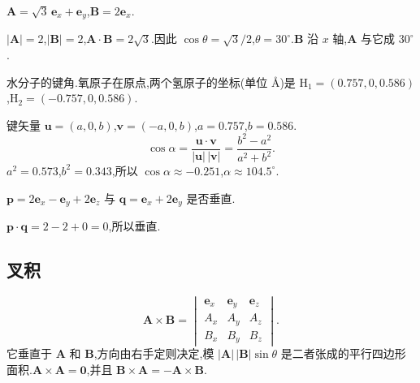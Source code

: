 \begin{example}
$\mathbf{A}=\sqrt{3}\,\mathbf{e}_x+\mathbf{e}_y$,$\mathbf{B}=2\mathbf{e}_x$.
\end{example}
\begin{solution}
$|\mathbf{A}|=2$,$|\mathbf{B}|=2$,$\mathbf{A}\cdot\mathbf{B}=2\sqrt{3}$.因此 $\cos\theta=\sqrt{3}/2$,$\theta=30^\circ$.$\mathbf{B}$ 沿 $x$ 轴,$\mathbf{A}$ 与它成 $30^\circ$.
\end{solution}

\begin{example}
水分子的键角.氧原子在原点,两个氢原子的坐标(单位 \AA)是 $\mathrm{H}_1=(0.757,0,0.586)$,$\mathrm{H}_2=(-0.757,0,0.586)$.
\end{example}
\begin{solution}
键矢量 $\mathbf{u}=(a,0,b)$,$\mathbf{v}=(-a,0,b)$,$a=0.757$,$b=0.586$.
\begin{equation}
  \cos\alpha=\frac{\mathbf{u}\cdot\mathbf{v}}{|\mathbf{u}|\,|\mathbf{v}|}
  =\frac{b^2-a^2}{a^2+b^2}.
\end{equation}
$a^2=0.573$,$b^2=0.343$,所以 $\cos\alpha\approx -0.251$,$\alpha\approx 104.5^\circ$.
\end{solution}

\begin{example}
$\mathbf{p}=2\mathbf{e}_x-\mathbf{e}_y+2\mathbf{e}_z$ 与 $\mathbf{q}=\mathbf{e}_x+2\mathbf{e}_y$ 是否垂直.
\end{example}
\begin{solution}
$\mathbf{p}\cdot\mathbf{q}=2-2+0=0$,所以垂直.
\end{solution}

\subsection{叉积}
\begin{equation}
  \mathbf{A}\times\mathbf{B}
  =
  \begin{vmatrix}
    \mathbf{e}_x & \mathbf{e}_y & \mathbf{e}_z \\
    A_x & A_y & A_z \\
    B_x & B_y & B_z
  \end{vmatrix}.
\end{equation}
它垂直于 $\mathbf{A}$ 和 $\mathbf{B}$,方向由右手定则决定,模 $|\mathbf{A}|\,|\mathbf{B}|\sin\theta$ 是二者张成的平行四边形面积.$\mathbf{A}\times\mathbf{A}=\mathbf{0}$,并且 $\mathbf{B}\times\mathbf{A}=-\mathbf{A}\times\mathbf{B}$.

